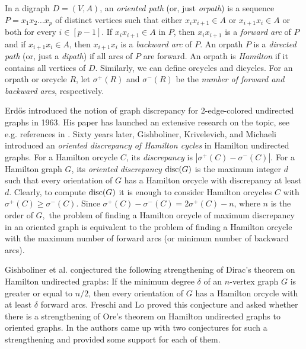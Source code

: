 \documentclass{article}
\newcommand{\2}{\vspace{2mm}}
\theoremstyle{definition}
\begin{document}
In a digraph $D=(V,A)$, an {\em oriented path} (or, just {\em orpath}) is a sequence $P=x_1x_2\dots x_p$ of distinct vertices such that either $x_ix_{i+1}\in A$ or $x_{i+1}x_{i}\in A$ or both for every $i\in [p-1]$. If $x_ix_{i+1}\in A$ in $P$, then $x_ix_{i+1}$ is a {\em forward arc} of $P$ and if  $x_{i+1}x_{i}\in A$, then  $x_{i+1}x_{i}$ is a {\em backward arc} of $P.$  An orpath $P$ is a {\em directed path} (or, just a {\em dipath}) if all arcs of $P$ are forward. An orpath is {\em Hamilton} if it contains all vertices of $D$. Similarly, we can define orcycles and dicycles. For an orpath or orcycle $R$, let $\sigma^+(R)$ and $\sigma^-(R)$ be the {\em number of forward and backward arcs}, respectively. 


Erd{\H o}s \cite{Erdos63} introduced the notion of graph discrepancy for 2-edge-colored undirected graphs in 1963.
His paper has launched an extensive research on the topic, see e.g. references in \cite{FL24,GKM23}. Sixty years later, Gishboliner, Krivelevich, and Michaeli \cite{GKM23} introduced an {\em oriented discrepancy of Hamilton cycles} in Hamilton undirected graphs. For a Hamilton orcycle $C$, its {\em discrepancy} is $|\sigma^+(C)-\sigma^-(C)|$. 
For a Hamilton graph $G$, its {\em oriented discrepancy} ${\rm disc}(G)$ is the maximum integer $d$ such that every orientation of $G$ has a Hamilton orcycle with discrepancy at least $d$. 
Clearly, to compute  ${\rm disc}(G)$ it is enough to consider Hamilton orcycles $C$ with $\sigma^+(C)\ge \sigma^-(C).$ Since $\sigma^+(C) -  \sigma^-(C)=2\sigma^+(C) - n$, where $n$ is the order of $G,$ the problem of finding a Hamilton orcycle of maximum discrepancy in an oriented graph is equivalent to the problem of finding a Hamilton orcycle with the maximum number of forward arcs (or minimum number of backward arcs). 

Gishboliner et al. \cite{GKM23} conjectured the following strengthening of Dirac's theorem on Hamilton undirected graphs: If the minimum degree $\delta$ of an $n$-vertex graph $G$ is greater or equal to $n/2$, then every orientation of $G$ 
has a Hamilton orcycle with at least $\delta$ forward arcs. Freschi and Lo \cite{FL24} proved this conjecture and asked whether there is a strengthening of Ore's theorem on Hamilton undirected graphs to oriented graphs. In  \cite{Ai+26Ore}  the authors came up with two conjectures for such a strengthening and provided some support for each of them. 
\end{document}
